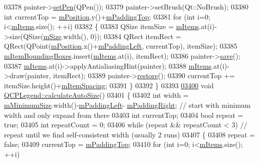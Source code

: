 \begin{DoxyCode}
03378   painter->\hyperlink{a00047_af9c7a4cd1791403901f8c5b82a150195}{setPen}(QPen());
03379   painter->setBrush(Qt::NoBrush);
03380   \textcolor{keywordtype}{int} currentTop = \hyperlink{a00045_a1a1033e581aba17a234a320b7fffc739}{mPosition}.y()+\hyperlink{a00045_aea0340bde711162822811bcc4ebc3c74}{mPaddingTop};
03381   \textcolor{keywordflow}{for} (\textcolor{keywordtype}{int} i=0; i<\hyperlink{a00045_a9ae61eaf9434d9f315696bf03c8e4455}{mItems}.size(); ++i)
03382   \{
03383     QSize itemSize = \hyperlink{a00045_a9ae61eaf9434d9f315696bf03c8e4455}{mItems}.at(i)->size(QSize(\hyperlink{a00045_aa55b33bf64e26c76e6475fd3140af8a2}{mSize}.width(), 0));
03384     QRect itemRect = QRect(QPoint(\hyperlink{a00045_a1a1033e581aba17a234a320b7fffc739}{mPosition}.x()+\hyperlink{a00045_ab7b535988eb6f9d0e4ae6c33ca0e5b03}{mPaddingLeft}, currentTop), itemSize);
03385     \hyperlink{a00045_ae3cf93cee4fa6e7b1966e3c5597004c3}{mItemBoundingBoxes}.insert(\hyperlink{a00045_a9ae61eaf9434d9f315696bf03c8e4455}{mItems}.at(i), itemRect);
03386     painter->\hyperlink{a00047_a8fd6821ee6fecbfa04444c9062912abd}{save}();
03387     \hyperlink{a00045_a9ae61eaf9434d9f315696bf03c8e4455}{mItems}.at(i)->applyAntialiasingHint(painter);
03388     \hyperlink{a00045_a9ae61eaf9434d9f315696bf03c8e4455}{mItems}.at(i)->draw(painter, itemRect);
03389     painter->\hyperlink{a00047_a64908e6298d5bbd83457dc987cc3a022}{restore}();
03390     currentTop += itemSize.height()+\hyperlink{a00045_acb16d1d1f6289185e8a5be2ea7f7d635}{mItemSpacing};
03391   \}
03392 \}
03393 
\hypertarget{a00115_source_l03400}{}\hyperlink{a00045_aefb91ff99ea360dede1a96b91e14fcd2}{03400} \textcolor{keywordtype}{void} \hyperlink{a00045_aefb91ff99ea360dede1a96b91e14fcd2}{QCPLegend::calculateAutoSize}()
03401 \{
03402   \textcolor{keywordtype}{int} width = \hyperlink{a00045_a52f5ad2b7fe948e98286447165953c40}{mMinimumSize}.width()-\hyperlink{a00045_ab7b535988eb6f9d0e4ae6c33ca0e5b03}{mPaddingLeft}-
      \hyperlink{a00045_a99eb704ee554eece4dac0833cbc5ee91}{mPaddingRight}; \textcolor{comment}{// start with minimum width and only expand from there}
03403   \textcolor{keywordtype}{int} currentTop;
03404   \textcolor{keywordtype}{bool} repeat = \textcolor{keyword}{true};
03405   \textcolor{keywordtype}{int} repeatCount = 0;
03406   \textcolor{keywordflow}{while} (repeat && repeatCount < 3) \textcolor{comment}{// repeat until we find self-consistent width (usually 2 runs)}
03407   \{
03408     repeat = \textcolor{keyword}{false};
03409     currentTop = \hyperlink{a00045_aea0340bde711162822811bcc4ebc3c74}{mPaddingTop};
03410     \textcolor{keywordflow}{for} (\textcolor{keywordtype}{int} i=0; i<\hyperlink{a00045_a9ae61eaf9434d9f315696bf03c8e4455}{mItems}.size(); ++i)

\end{DoxyCode}
